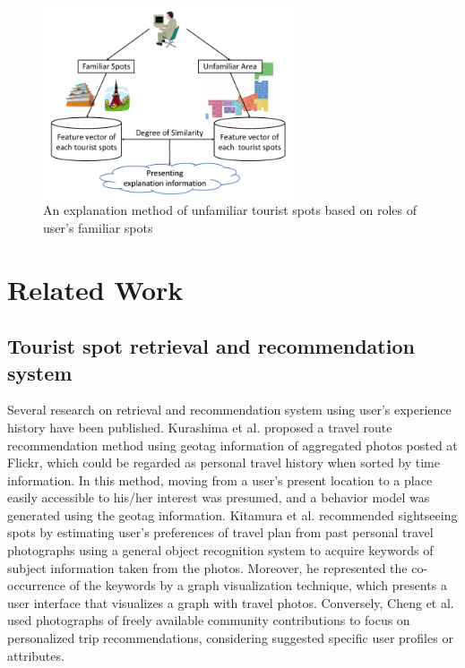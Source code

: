 \documentclass[journal]{IAENGtran}
\begin{document}
\begin{figure}[t]
  \begin{center}
    \includegraphics[clip,width=7.5cm,bb=0 0 720 540]{picture/Photo_Image_eng.png}
    \caption{An explanation method of unfamiliar tourist spots based on roles of user's familiar spots}
    \label{fig:Photo_Image}
   \end{center}
\end{figure}

\section{Related Work}
\label{sec:Related Work}
\subsection{Tourist spot retrieval and recommendation system}
\label{subsec:Tourist spot retrieval and recommendation system}

   Several research on retrieval and recommendation system using user's experience history have been published. Kurashima et al.\cite{Codd01} proposed a travel route recommendation method using geotag information of aggregated photos posted at Flickr, which could be regarded as personal travel history when sorted by time information. In this method, moving from a user's present location to a place easily accessible to his/her interest was presumed, and a behavior model was generated using the geotag information. Kitamura et al.\cite{Codd02} recommended sightseeing spots by estimating user's preferences of travel plan from past personal travel photographs using a general object recognition system to acquire keywords of subject information taken from the photos. Moreover, he represented the co-occurrence of the keywords by a graph visualization technique, which presents a user interface that visualizes a graph with travel photos. Conversely, Cheng et al.\cite{Codd03} used photographs of freely available community contributions to focus on personalized trip recommendations, considering suggested specific user profiles or attributes.
\end{document}

